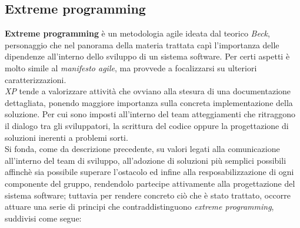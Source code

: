 \documentclass{article}
\begin{document}
\subsection*{Extreme programming}
\large
\textbf{Extreme programming} è un metodologia agile ideata dal teorico \textit{Beck}, personaggio che nel panorama della materia trattata capì l'importanza delle dipendenze all'interno dello sviluppo di un sistema software. Per certi aspetti è molto simile al \textit{manifesto agile}, ma provvede a focalizzarsi su ulteriori caratterizzazioni.\vspace*{14pt}\\
\textit{XP} tende a valorizzare attività che ovviano alla stesura di una documentazione dettagliata, ponendo maggiore importanza sulla concreta implementazione della soluzione. Per cui sono imposti all'interno del team atteggiamenti che ritraggono il dialogo tra gli sviluppatori, la scrittura del codice oppure la progettazione di soluzioni inerenti a problemi sorti.\vspace*{14pt}\\
Si fonda, come da descrizione precedente, su valori legati alla comunicazione all'interno del team di sviluppo, all'adozione di soluzioni più semplici possibili affinchè sia possibile superare l'ostacolo ed infine alla resposabilizzazione di ogni componente del gruppo, rendendolo partecipe attivamente alla progettazione del sistema software; tuttavia per rendere concreto ciò che è stato trattato, occorre attuare una serie di principi che contraddistinguono \textit{extreme programming}, suddivisi come segue:
\end{document}
